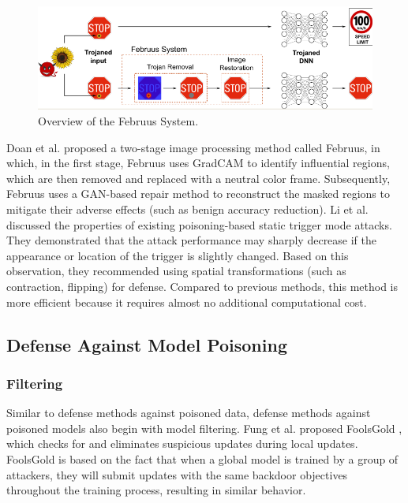 \documentclass[conference]{IEEEtran}
\begin{document}
\begin{figure}[htbp]
    \centerline{\includegraphics[width=0.8\linewidth,height=0.4\linewidth]{picture/f9.png}}
    \caption{Overview of the Februus System.}
    \label{fig9}
\end{figure}
Doan et al. \cite{b76}proposed a two-stage image processing method called Februus, in which,
in the first stage, Februus uses GradCAM to identify influential regions, which are then
removed and replaced with a neutral color frame. Subsequently, Februus uses a GAN-based
repair method to reconstruct the masked regions to mitigate their adverse effects (such as benign accuracy reduction).
Li et al. \cite{b77} discussed the properties of existing poisoning-based static trigger mode attacks. They demonstrated
that the attack performance may sharply decrease if the appearance or location of the trigger is slightly changed.
Based on this observation, they recommended using spatial transformations (such as contraction, flipping)
for defense. Compared to previous methods, this method is more efficient because it requires almost no additional computational cost.

\subsection{Defense Against Model Poisoning}  
\subsubsection{Filtering}
Similar to defense methods against poisoned data, defense methods against poisoned models also begin with model filtering. 
Fung et al. proposed FoolsGold \cite{b78}, which checks for and eliminates suspicious updates during local updates. 
FoolsGold is based on the fact that when a global model is trained by a group of attackers, they will submit updates with 
the same backdoor objectives throughout the training process, resulting in similar behavior.   
\end{document}
